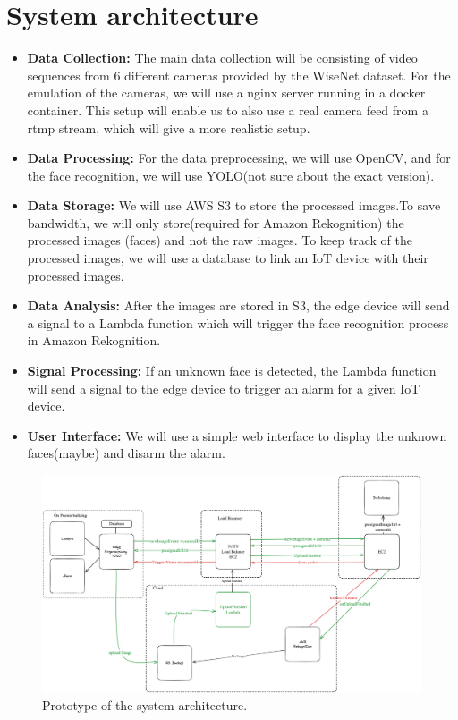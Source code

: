 \documentclass[conference]{IEEEtran}
\begin{document}
\section{System architecture}
\begin{itemize}
    \item \textbf{Data Collection:} The main data collection will be consisting of video sequences from 6 different cameras provided by the WiseNet dataset.
          For the emulation of the cameras, we will use a nginx server running in a docker container. This setup will
          enable us to also use a real camera feed from a rtmp stream, which will give a more realistic setup.
    \item \textbf{Data Processing:} For the data preprocessing, we will use OpenCV, and for the face recognition, we will use YOLO(not sure about the exact version).
    \item \textbf{Data Storage:} We will use AWS S3 to store the processed images.To save bandwidth, we will only store(required for Amazon Rekognition) the processed images (faces)
          and not the raw images. To keep track of the processed images, we will use a database to link an IoT device with their processed images.
    \item \textbf{Data Analysis:} After the images are stored in S3, the edge device will send a signal to a Lambda function which will trigger the face recognition
          process in Amazon Rekognition.
    \item \textbf{Signal Processing:} If an unknown face is detected, the Lambda function will send a signal to the edge device to trigger an alarm for a given IoT device.
    \item \textbf{User Interface:} We will use a simple web interface to display the unknown faces(maybe) and disarm the alarm.
\end{itemize}

\begin{figure}[h!]
    \centering
    \includegraphics[width=1\linewidth]{images/architecturev2.excalidraw.png}
    \caption{Prototype of the system architecture.}
    \label{fig:enter-label}
\end{figure}
\end{document}
